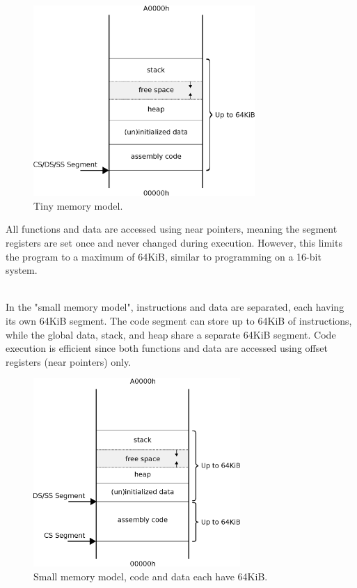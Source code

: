 \documentclass[book.tex]{subfiles}
\begin{document}
\begin{figure}[H]
\centering
\includegraphics[width=0.75\textwidth]{imgs/drawings/memory/tiny_mm.eps}
\caption{Tiny memory model.}
\label{fig:mm_tiny}
\end{figure}

\par
All functions and data are accessed using near pointers, meaning the segment registers are set once and never changed during execution. However, this limits the program to a maximum of 64KiB, similar to programming on a 16-bit system.\\

\\

\par
In the "small memory model", instructions and data are separated, each having its own 64KiB segment. The code segment can store up to 64KiB of instructions, while the global data, stack, and heap share a separate 64KiB segment. Code execution is efficient since both functions and data are accessed using offset registers (near pointers) only.\\


\begin{figure}[H]
\centering
\includegraphics[width=0.7\textwidth]{imgs/drawings/memory/small_mm.eps}
\caption{Small memory model, code and data each have 64KiB.}
\label{fig:mm_small} 
\end{figure}
\end{document}
